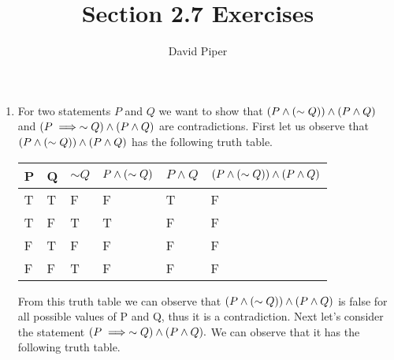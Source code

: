 \documentclass[12pt]{article}
\title{Section 2.7 Exercises}
\author{David Piper}
\makeatletter
\newcommand*{\arabicodd}[1]{%
  \expandafter\@arabicodd\csname c@#1\endcsname
}
\newcommand*{\@arabicodd}[1]{%
  \@arabic{\numexpr(#1)*2-1\relax}%
}
\makeatother
\begin{document}
\maketitle

\begin{enumerate}[label=2.\arabicodd*, start=24]
  \item
        For two statements $P$ and $Q$ we want to show that $\qty(P \land \qty(\sim Q)) \land \qty(P \land Q)$
        and $\qty(P \implies \sim Q) \land \qty(P \land Q)$ are contradictions.
        First let us observe that $\qty(P \land \qty(\sim Q)) \land \qty(P \land Q)$ has the following truth table.
        \hfill
        \hfill
        \hfill
        \linebreak
        \linebreak
        \begin{minipage}{\linewidth}
          \begin{tabular}{@{}llllll@{}}
            \toprule
            P & Q & $\sim Q$ & $P \land \qty(\sim Q)$ & $P \land Q$ & $\qty(P \land \qty(\sim Q)) \land \qty(P \land Q)$ \\ \midrule
            T & T & F        & F                      & T           & F                                                  \\
            T & F & T        & T                      & F           & F                                                  \\
            F & T & F        & F                      & F           & F                                                  \\
            F & F & T        & F                      & F           & F                                                  \\ \bottomrule
          \end{tabular}
        \end{minipage}
        \linebreak
        \linebreak
        From this truth table we can observe that $\qty(P \land \qty(\sim Q)) \land \qty(P \land Q)$ is
        false for all possible values of P and Q, thus it is a contradiction.
        \linebreak
        \linebreak
        Next let's consider the statement $\qty(P \implies \sim Q) \land \qty(P \land Q).$
        We can observe that it has the following truth table.
        \hfill

\end{enumerate}
\end{document}
